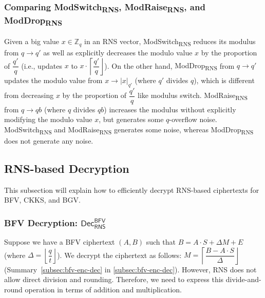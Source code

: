 \subsubsection{Comparing \textsf{ModSwitch\textsubscript{RNS}}, \textsf{ModRaise\textsubscript{RNS}}, and \textsf{ModDrop\textsubscript{RNS}}}

Given a big value $x \in \mathbb{Z}_q$ in an RNS vector, \textsf{ModSwitch\textsubscript{RNS}} reduces its modulus from $q \rightarrow  q'$ as well as explicitly decreases the modulo value $x$ by the proportion of $\dfrac{q'}{q}$ (i.e., updates $x$ to $x \cdot \left\lceil\dfrac{q'}{q}\right\rfloor$). On the other hand, \textsf{ModDrop\textsubscript{RNS}} from $q \rightarrow q'$ updates the modulo value from $x \rightarrow |x|_{q'}$ (where $q'$ divides $q$), which is different from decreasing $x$ by the proportion of $\dfrac{q'}{q}$ like modulus switch. \textsf{ModRaise\textsubscript{RNS}} from $q \rightarrow qb$ (where $q$ divides $qb$) increases the modulus without explicitly modifying the modulo value $x$, but generates some $q$-overflow noise. \textsf{ModSwitch\textsubscript{RNS}} and \textsf{ModRaise\textsubscript{RNS}} generates some noise, whereas \textsf{ModDrop\textsubscript{RNS}} does not generate any noise. %




\subsection{RNS-based Decryption}
\label{subsec:rns-dec}

This subsection will explain how to efficiently decrypt RNS-based ciphertexts for BFV, CKKS, and BGV. 


\subsubsection{BFV Decryption: $\textsf{Dec}_{\textsf{RNS}}^{\textsf{BFV}}$}
\label{subsubsec:rns-dec-bfv}

Suppose we have a BFV ciphertext $(A, B)$ such that $B = A\cdot S + \Delta M + E$ (where $\Delta = \left\lfloor\dfrac{q}{t}\right\rfloor$). We decrypt the ciphertext as follows: $M = \left\lceil\dfrac{B - A\cdot S}{\Delta}\right\rfloor$ (Summary~\ref*{subsec:bfv-enc-dec} in \autoref{subsec:bfv-enc-dec}). However, RNS does not allow direct division and rounding. Therefore, we need to express this divide-and-round operation in terms of addition and multiplication.

